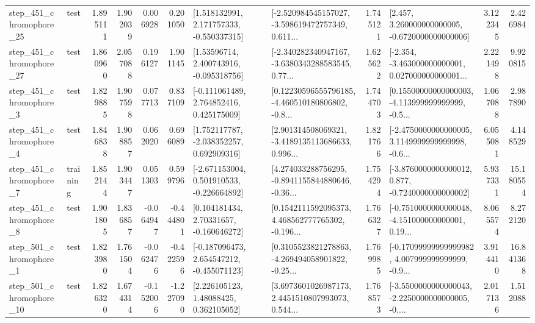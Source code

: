 \begin{tabular}{llrrrrllrlrr}
  step\_451\_chromophore\_25 &      test &      1.895111 &    1.902039 &      0.006928 &  0.201050 &    [1.518132991, 2.171757333, -0.550337315] &  [-2.520984545157027, -3.598619472757349, 0.611... &       1.745121 &    [2.457, 3.260000000000005, -0.6720000000000006] &            3.122345 &          2.426984 \\
  step\_451\_chromophore\_27 &      test &      1.860960 &    2.057088 &      0.196127 &  1.901145 &     [1.53596714, 2.400743916, -0.095318756] &  [-2.340282340947167, -3.6380343288583545, 0.77... &       1.625622 &  [-2.354, -3.463000000000001, 0.027000000000001... &            2.221498 &          9.920815 \\
   step\_451\_chromophore\_3 &      test &      1.829885 &    1.907598 &      0.077713 &  0.837109 &    [-0.111061489, 2.764852416, 0.425175009] &  [0.12230596555796185, -4.460510180806802, -0.8... &       1.744703 &  [0.15500000000000003, -4.113999999999999, -0.5... &            1.067088 &          2.987890 \\
   step\_451\_chromophore\_4 &      test &      1.846838 &    1.908857 &      0.062020 &  0.696089 &    [1.752117787, -2.038352257, 0.692909316] &  [2.901314508069321, -3.4189135113686633, 0.996... &       1.821766 &  [-2.4750000000000005, 3.1149999999999998, -0.6... &            6.055081 &          4.148529 \\
   step\_451\_chromophore\_7 &  training &      1.852144 &    1.903447 &      0.051303 &  0.599796 &   [-2.671153004, 0.501910533, -0.226664892] &  [4.274033288756295, -0.8941155844880646, -0.36... &       1.754294 &  [-3.8760000000000012, 0.877, -0.7240000000000002] &            5.937331 &         15.180554 \\
   step\_451\_chromophore\_8 &      test &      1.901805 &    1.836857 &     -0.064947 & -0.444801 &     [0.104181434, 2.70331657, -0.160646272] &  [0.1542111592095373, 4.468562777765302, -0.196... &       1.766327 &  [-0.7510000000000048, -4.151000000000001, 0.19... &            8.065574 &          8.272120 \\
   step\_501\_chromophore\_1 &      test &      1.823980 &    1.761504 &     -0.062476 & -0.422596 &   [-0.187096473, 2.654547212, -0.455071123] &  [0.3105523821278863, -4.269494058901822, -0.25... &       1.769985 &  [-0.17099999999999982, 4.007999999999999, -0.9... &            3.914410 &         16.841368 \\
  step\_501\_chromophore\_10 &      test &      1.826320 &    1.674314 &     -0.152006 & -1.227090 &      [2.226105123, 1.48088425, 0.362105052] &  [3.6973601026987173, 2.4451510807993073, 0.544... &       1.768573 &  [-3.5500000000000043, -2.2250000000000005, -0.... &            2.017136 &          1.512088 \\

\end{tabular}
